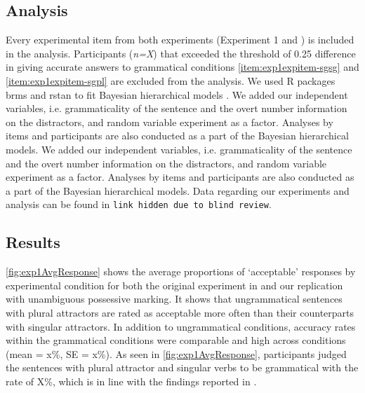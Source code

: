 \documentclass[doc,a4paper,man,natbib,floatsintext,noextraspace]{apa6}\usepackage[]{graphicx}\usepackage[]{color}
\begin{document}
\subsection{Analysis} \label{sec:exp1:analysis}

Every experimental item from both experiments (Experiment 1 and \citet{LagoEtAl:2018}) is included in the analysis. Participants (\textit{n=X}) that exceeded the threshold of 0.25 difference in giving accurate answers to grammatical conditions \ref{item:exp1expitem-sgsg} and \ref{item:exp1expitem-sgpl} are excluded from the analysis. We used R packages brms \citep{R-brms_b} and rstan \citep{R-stan} to fit Bayesian hierarchical models \citep{GelmanHill:2007}. We added our independent variables, i.e. grammaticality of the sentence and the overt number information on the distractors, and random variable experiment as a factor. Analyses by items and participants are also conducted as a part of the Bayesian hierarchical models. We added our independent variables, i.e. grammaticality of the sentence and the overt number information on the distractors, and random variable experiment as a factor. Analyses by items and participants are also conducted as a part of the Bayesian hierarchical models.
Data regarding our experiments and analysis can be found in \texttt{link hidden due to blind review}.



\subsection{Results} \label{sec:exp1:results}


\autoref{fig:exp1AvgResponse} shows the average proportions of ‘acceptable’ responses by experimental condition for both the original experiment in \citet{LagoEtAl:2018} and our replication with unambiguous possessive marking. It shows that ungrammatical sentences with plural attractors are rated as acceptable more often than their counterparts with singular attractors. In addition to ungrammatical conditions, accuracy rates within the grammatical conditions were comparable and high across conditions (mean = x\%, SE = x\%). As seen in \autoref{fig:exp1AvgResponse}, participants judged the sentences with plural attractor and singular verbs to be grammatical with the rate of X\%, which is in line with the findings reported in \citet{LagoEtAl:2018}.    
\end{document}
